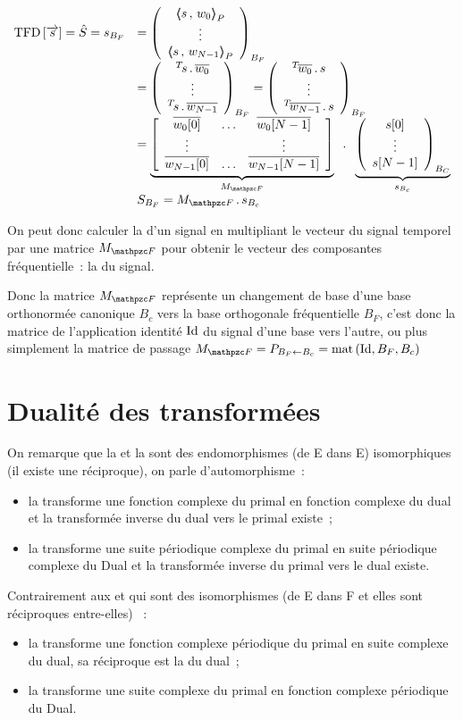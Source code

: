 \begin{equation}
  \label{eq:tfd_matrice}
  \begin{array}{ll}
    \mTFD\b{\vec{s}} = \hat{S}=s_{B_F}&=\vvvectBase{\scaldp{s}{w_0}}{\vdots}{\scaldp{s}{w_{N-1}}}{B_F}\\
    &= \vvvectBase{\Tr{s} \, .\, \conj{w_0}}{\vdots}{\Tr{s} \, .\, \conj{w_{N-1}}}{B_F} = \vvvectBase{\Tr{\conj{w_0}} \, .\, s}{\vdots}{\Tr{\conj{w_{N-1}}} \, .\, s}{B_F}  \\
                                      &=\caCest{\b{\mmmaaatrice{\conj{w_0[0]}}{\ldots}{\conj{w_0[N-1]}}{\vdots}{}{\vdots}{\conj{w_{N-1}[0]}}{\ldots}{\conj{w_{N-1}[N-1]}}}}{M_{\F}}\;\;.\;\; \caCest{\vvvectBase{s[0]}{\vdots}{s[N-1]}{B_C}}{s_{B_c}} \\
    &S_{B_F} = M_{\F}\,.\,s_{B_c} 
  \end{array}
\end{equation}

On peut donc calculer la \TFD{} d'un signal en multipliant le vecteur du signal temporel par une matrice $M_{\F}$ pour obtenir le vecteur des composantes fréquentielle~: la \TFD{} du signal.

Donc la matrice $M_{\F}$ représente un changement de base d'une base orthonormée canonique $B_c$ vers la  base orthogonale fréquentielle $B_F$, c'est donc la matrice de l'application identité $\mathrm{Id}$ du signal d'une base vers l'autre, ou plus simplement la matrice de passage $M_{\F} = P_{B_F\leftarrow B_c} = \mat\p{\Id,B_F,B_c}$
\section{Dualité des transformées}
\label{sec:dualite}

On remarque que la \TF{} et la \TFD{} sont des endomorphismes (de E
dans E) isomorphiques (il existe une réciproque), on parle
d'automorphisme~:
\begin{itemize}
\item la \TF{} transforme une fonction complexe du primal en fonction
  complexe du dual et la transformée inverse du dual vers le primal
  existe~;
\item la \TFD{} transforme une suite périodique complexe du primal en
  suite périodique complexe du Dual et la transformée inverse du
  primal vers le dual existe.
\end{itemize}

Contrairement aux \sdf{} et \TFSD{} qui sont des isomorphismes (de E
dans F et elles sont réciproques entre-elles) ~:
\begin{itemize}
\item la \sdf{} transforme une fonction complexe périodique du primal
  en suite complexe du dual, sa réciproque est la \TFD{} du dual~;
\item la \TFSD{} transforme une suite complexe du primal en fonction
  complexe périodique du Dual.
\end{itemize}


